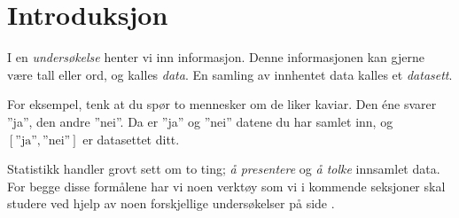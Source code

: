 



\section{Introduksjon}
I en \textit{undersøkelse} henter vi inn informasjon. Denne informasjonen kan gjerne være tall eller ord, og kalles \textit{data}. En samling av innhentet data kalles et \textit{datasett}. \vsk

For eksempel, tenk at du spør to mennesker om de liker kaviar. Den éne svarer ''ja'', den andre ''nei''. Da er ''ja'' og ''nei'' datene du har samlet inn, og $ [\text{''ja''}, \text{''nei''}] $ er datasettet ditt. \vsk

Statistikk handler grovt sett om to ting;  \textsl{å presentere} og \textsl{å tolke} innsamlet data. For begge disse formålene har vi noen verktøy som vi i kommende seksjoner skal studere ved hjelp av noen forskjellige undersøkelser på side \pageref{undersok}. \vsk

